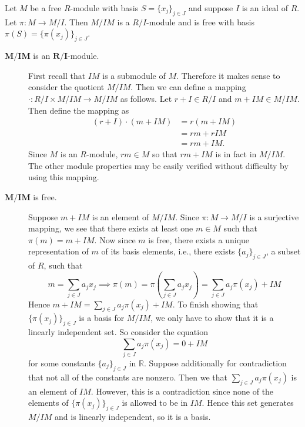 \begin{proposition}
    Let $M$ be a free $R$-module with basis $S = \{x_j\}_{j \in
    J}$ and suppose $I$ is an ideal of $R$. Let $\pi: M \to M/I$.
    Then
    $M/IM$ is a $R/I$-module and is free with basis $\pi(S) = 
    \{ \pi(x_j)\}_{j \in J}$.
\end{proposition}

\begin{prf}
    \begin{description}
        \item[$\bm{M/IM}$ is an $\bm{R/I}$-module.]
        First recall that $IM$ is a submodule of $M$. Therefore it
        makes sense to consider the quotient $M/IM$. Then we can
        define a mapping $\cdot: R/I \times M/IM \to M/IM$ as follows. Let $r
        + I \in R/I$ and $m + IM \in M/IM$. Then define the mapping as
        \begin{align*}
            (r + I)\cdot(m + IM) &= r(m + IM)\\
            &= rm + rIM\\
            &= rm + IM.
        \end{align*}
        Since $M$ is an $R$-module, $rm \in M$ so that $rm + IM$ is in
        fact in $M/IM$. The other module properties may be easily
        verified without difficulty by using this mapping. 

        \item[$\bm{M/IM}$ is free.] 
        Suppose $m+ IM$ is an element of $M/IM$. Since $\pi: M \to
        M/I$ is a surjective mapping, we see that there exists at
        least one $m \in M$ such that $\pi(m) = m + IM$. Now since
        $m$ is free, there exists a unique representation of $m$
        of its basis elements, i.e., there exists $\{a_j\}_{j \in
        J}$, a subset of $R$, such that 
        \[
            m = \sum_{j \in J} a_jx_j \implies  \pi(m) = \pi\left(\sum_{j \in J} a_jx_j \right) =
            \sum_{j \in J} a_j\pi(x_j) + IM
        \]
        Hence $m + IM = \sum_{j \in J} a_j\pi(x_j) + IM.$ To finish showing
        that $\{\pi(x_j)\}_{j \in J}$ is a basis for $M/IM$, we
        only have to show that it is a linearly independent
        set. So consider the equation 
        \[
            \sum_{j \in J}a_j\pi(x_j) = 0 + IM                
        \]
        for some constants $\{a_j\}_{j \in J}$ in $\mathbb{R}$.
        Suppose additionally for contradiction that not all of the
        constants are nonzero. Then we that $\sum_{j \in
        J}a_j\pi(x_j)$ is an element of $IM$. However, this is a
        contradiction since none of the elements of
        $\{\pi(x_j)\}_{j \in J}$ is allowed to be in $IM$. Hence
        this set generates $M/IM$ and is linearly independent, so
        it is a basis.
    \end{description}
\end{prf}

